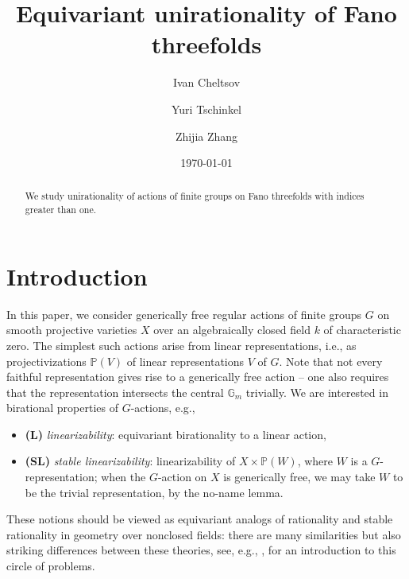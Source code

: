 \documentclass[12pt,reqno]{amsart}
\theoremstyle{plain}
\theoremstyle{remark}
\theoremstyle{definition}
\numberwithin{equation}{section}
\def\bG{{\mathbb G}}
\def\bP{{\mathbb P}}
\begin{document}
\title[Equivariant unirationality]{Equivariant unirationality of Fano threefolds}



\author[I. Cheltsov]{Ivan Cheltsov}
\address{Department of Mathematics, University of Edinburgh, UK}



\author[Yu. Tschinkel]{Yuri Tschinkel}
\address{
  Courant Institute,
  251 Mercer Street,
  New York, NY 10012, USA
}

\address{Simons Foundation\\
160 Fifth Avenue\\
New York, NY 10010\\
USA}



\author[Zh. Zhang]{Zhijia Zhang}

\address{
Courant Institute,
  251 Mercer Street,
  New York, NY 10012, USA
}





\date{\today}

\begin{abstract}
We study unirationality of actions of finite groups on Fano threefolds with indices greater than one.
\end{abstract}

\maketitle

\section{Introduction}
\label{sec.intro}

In this paper, we consider generically free regular actions of finite groups $G$ on smooth projective varieties $X$ over an algebraically closed field  $k$ of characteristic zero. The simplest such actions arise from linear representations, i.e., as projectivizations $\bP(V)$ of linear representations $V$ of $G$. Note that not every faithful representation gives rise to a generically free action -- one also requires that the representation intersects the central $\bG_m$ trivially. 
We are interested in birational properties of $G$-actions, e.g., 
\begin{itemize}
\item {\bf (L)} {\em linearizability}: equivariant birationality to a linear action, 
\item {\bf (SL)} {\em stable linearizability}: linearizability of $X\times\bP(W)$, 
where $W$ is a $G$-representation; when the $G$-action on $X$ is generically free, we may take $W$ to be the trivial representation, by the no-name lemma. 
\end{itemize}
These notions should be viewed as equivariant analogs of rationality and stable rationality in geometry over nonclosed fields: there are many similarities but also striking differences between these theories, 
see, e.g., \cite{BnG}, \cite{KT-vector} for an introduction to this circle of problems.  
\end{document}

